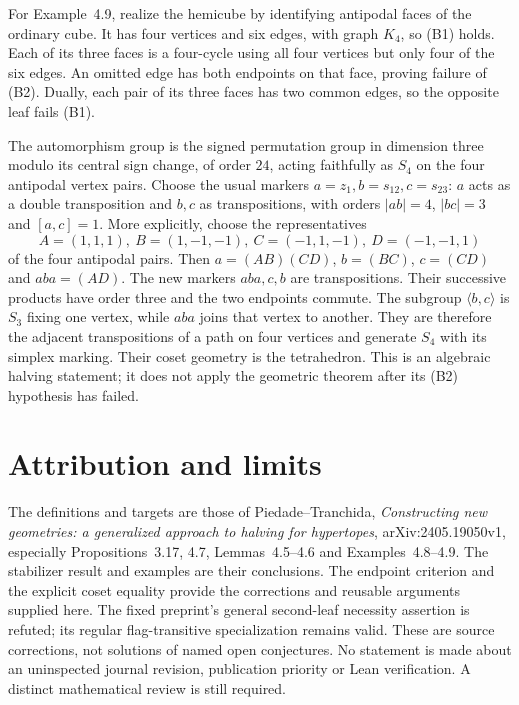 \documentclass[11pt,a4paper]{article}
\newcommand{\gen}[1]{\langle#1\rangle}
\begin{document}
For Example~4.9, realize the hemicube by identifying antipodal
faces of the ordinary cube. It has four vertices and six edges,
with graph $K_4$, so (B1) holds. Each of its three faces is a
four-cycle using all four vertices but only four of the six edges.
An omitted edge has both endpoints on that face, proving failure
of (B2). Dually, each pair of its three faces has two common edges,
so the opposite leaf fails (B1).

The automorphism group is the signed permutation group in dimension
three modulo its central sign change, of order $24$, acting faithfully
as $S_4$ on the four antipodal vertex pairs. Choose the usual markers
$a=z_1,b=s_{12},c=s_{23}$: $a$ acts as a double transposition and
$b,c$ as transpositions, with orders $|ab|=4$, $|bc|=3$ and
$[a,c]=1$. More explicitly, choose the representatives
\[
 A=(1,1,1),\ B=(1,-1,-1),\ C=(-1,1,-1),\ D=(-1,-1,1)
\]
of the four antipodal pairs. Then $a=(AB)(CD)$, $b=(BC)$,
$c=(CD)$ and $aba=(AD)$. The new markers $aba,c,b$ are transpositions. Their
successive products have order three and the two endpoints commute.
The subgroup $\gen{b,c}$ is $S_3$ fixing one vertex, while $aba$
joins that vertex to another. They are therefore the adjacent
transpositions of a path on four vertices and generate $S_4$ with
its simplex marking. Their coset geometry is the tetrahedron.
This is an algebraic halving statement; it does not apply the
geometric theorem after its (B2) hypothesis has failed.

\section{Attribution and limits}
The definitions and targets are those of Piedade--Tranchida,
\emph{Constructing new geometries: a generalized approach to halving
for hypertopes}, arXiv:2405.19050v1, especially Propositions~3.17,
4.7, Lemmas~4.5--4.6 and Examples~4.8--4.9. The stabilizer result
and examples are their conclusions. The endpoint criterion and
the explicit coset equality provide the corrections and reusable
arguments supplied here. The fixed preprint's general second-leaf
necessity assertion is refuted; its regular flag-transitive
specialization remains valid. These are source corrections, not
solutions of named open conjectures. No statement is made about
an uninspected journal revision, publication priority or Lean
verification. A distinct mathematical review is still required.
\end{document}
